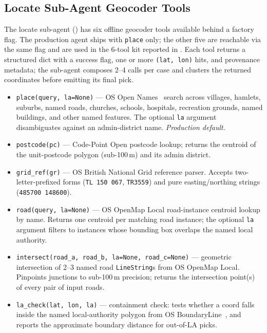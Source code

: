 \documentclass[11pt]{article}
\begin{document}
\subsection{Locate Sub-Agent Geocoder Tools}
\label{appendix:locate-tools}

The locate sub-agent () has six offline geocoder tools available behind a factory flag. The production agent ships with \texttt{place} only; the other five are reachable via the same flag and are used in the 6-tool kit reported in . Each tool returns a structured dict with a success flag, one or more \texttt{(lat, lon)} hits, and provenance metadata; the sub-agent composes 2--4 calls per case and clusters the returned coordinates before emitting its final pick.

\begin{itemize}[leftmargin=*, itemsep=2pt, topsep=2pt]
  \item \texttt{place(query, la=None)} --- OS Open Names~\cite{os_open_names} search across villages, hamlets, suburbs, named roads, churches, schools, hospitals, recreation grounds, named buildings, and other named features. The optional \texttt{la} argument disambiguates against an admin-district name. \emph{Production default.}
  \item \texttt{postcode(pc)} --- Code-Point Open postcode lookup; returns the centroid of the unit-postcode polygon (sub-100\,m) and its admin district.
  \item \texttt{grid\_ref(gr)} --- OS British National Grid reference parser. Accepts two-letter-prefixed forms (\texttt{TL 150 067}, \texttt{TR3559}) and pure easting/northing strings (\texttt{485700 148600}).
  \item \texttt{road(query, la=None)} --- OS OpenMap Local road-instance centroid lookup by name. Returns one centroid per matching road instance; the optional \texttt{la} argument filters to instances whose bounding box overlaps the named local authority.
  \item \texttt{intersect(road\_a, road\_b, la=None, road\_c=None)} --- geometric intersection of 2--3 named road \texttt{LineString}s from OS OpenMap Local. Pinpoints junctions to sub-100\,m precision; returns the intersection point(s) of every pair of input roads.
  \item \texttt{la\_check(lat, lon, la)} --- containment check: tests whether a coord falls inside the named local-authority polygon from OS BoundaryLine~\cite{os_boundary_line}, and reports the approximate boundary distance for out-of-LA picks.
\end{itemize}
\end{document}
